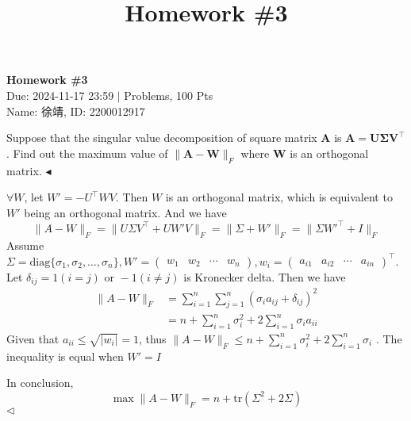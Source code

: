 \documentclass[11pt]{article}
\title{Homework \#3}
\newenvironment{problem}[2][Problem]{\begin{trivlist}
\item[\hskip \labelsep {\bfseries #1}\hskip \labelsep {\bfseries #2.}]}{\hfill$\blacktriangleleft$\end{trivlist}}
\newenvironment{answer}[1][Answer]{\begin{trivlist}
\item[\hskip \labelsep {\bfseries #1.}\hskip \labelsep]}{\hfill$\lhd$\end{trivlist}}
\begin{document}
\pagestyle{fancy}
\chead{}

\begin{center}
    {\LARGE \bf Homework \#3}\\
    {Due: 2024-11-17 23:59 \quad$|$ Problems, 100 Pts}\\
    {Name: 徐靖, ID: 2200012917}            %
\end{center}



\begin{problem}{1 (10')}
Suppose that the singular value decomposition of square matrix $\bm A$ is $\bm A = \bm U \bm \Sigma \bm V^\top$. Find out the maximum value of $\|\bm A - \bm W\|_F$ where $\bm W$ is an orthogonal matrix.
\end{problem}

\begin{answer}
    $\forall W$, let $W'=-U^\top WV$. Then $W$ is an orthogonal matrix, which is equivalent to $W'$ being an orthogonal matrix. And we have
$$\|A-W\|_F=\|U\Sigma V^\top+UW'V\|_F=\|\Sigma+W'\|_F= \| \Sigma W'^\top+I\|_F$$
Assume $\Sigma = \text{diag} \{\sigma_1,\sigma_2,\dots,\sigma_n\}, W'=\begin{pmatrix} w_1 & w_2 & \cdots & w_n \end{pmatrix}, w_i = \begin{pmatrix} a_{i1} & a_{i2} & \cdots & a_{in} \end{pmatrix}^\top$.
Let $\delta_{ij}= 1 (i=j) \text{ or } -1 (i\neq j)$ is  Kronecker delta.  Then we have
$$\begin{align*}\|A-W\|_F &= \sum_{i=1}^n\sum_{j=1}^n (\sigma_ia_{ij}+\delta_{ij})^2\\&=n+\sum_{i=1}^n{\sigma_i^2}+2\sum_{i=1}^n\sigma_ia_{ii}\end{align*}$$
Given that $a_{ii} \leq \sqrt{|w_i|} =1$, thus $\|A-W\|_F \leq n+\sum_{i=1}^n{\sigma_i^2}+2\sum_{i=1}^n\sigma_i$ . The inequality is equal when $W'=I$

In conclusion,
$$\max \|A-W\|_F =  n+\text{tr}(\Sigma^2+2\Sigma) $$
\end{answer}
\end{document}
